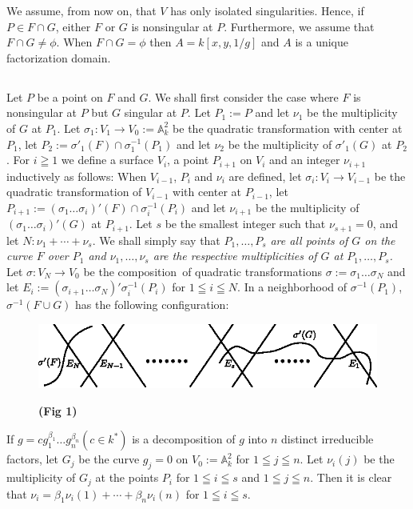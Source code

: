We assume, from now on, that $V$ has only isolated
singularities. Hence, if $P\in F\cap G$, either $F$ or $G$ is
nonsingular at $P$. Furthermore, we assume that $F\cap G\neq
\phi$. When $F\cap G=\phi$ then $A=k[x,y,1/g]$ and $A$ is a unique
factorization domain. 

\subsection{}\label{chap2:5.4}
Let $P$ be a point on $F$ and $G$. We shall first consider the case
where $F$ is nonsingular at $P$ but $G$ singular at $P$. Let
$P_{1}:=P$ and let $\nu_{1}$ be the multiplicity of $G$ at
$P_{1}$. Let $\sigma_{1}:V_{1}\to V_{0}:=\mathbb{A}^{2}_{k}$ be the
quadratic transformation with center at $P_{1}$, let
$P_{2}:=\sigma'_{1}(F)\cap \sigma^{-1}_{1}(P_{1})$ and let $\nu_{2}$
be the multiplicity of $\sigma'_{1}(G)$ at $P_{2}$. For $i\geqq 1$ we
define a surface $V_{i}$, a point $P_{i+1}$ on $V_{i}$ and an integer
$\nu_{i+1}$ inductively as follows: When $V_{i-1}$, $P_{i}$ and
$\nu_{i}$ are defined, let $\sigma_{i}:V_{i}\to V_{i-1}$ be the
quadratic transformation of $V_{i-1}$ with center at $P_{i-1}$, let
$P_{i+1}:=(\sigma_{1}\ldots\sigma_{i})'(F)\cap \sigma^{-1}_{i}(P_{i})$
and let $\nu_{i+1}$ be the multiplicity of
$(\sigma_{1}\ldots\sigma_{i})'(G)$ at $P_{i+1}$. Let $s$ be the
smallest integer such that $\nu_{s+1}=0$, and let
$N:\nu_{1}+\cdots+\nu_{s}$. We shall simply say that
$P_{1},\ldots,P_{s}$ {\em are all points of $G$ on the curve $F$ over
  $P_{1}$ and $\nu_{1},\ldots,\nu_{s}$ are the respective
  multiplicities of $G$ at $P_{1},\ldots,P_{s}$.} Let $\sigma:V_{N}\to
V_{0}$ be the composition\pageoriginale\ of quadratic transformations
$\sigma:=\sigma_{1}\ldots\sigma_{N}$ and let
$E_{i}:=(\sigma_{i+1}\ldots\sigma_{N})'\sigma^{-1}_{i}(P_{i})$ for
$1\leqq i\leqq N$. In a neighborhood of $\sigma^{-1}(P_{1})$,
$\sigma^{-1}(F\cup G)$ has the following configuration:
\begin{figure}[H]
\centering
\includegraphics[scale=1.2]{figures/chap2-fig10.eps}

\medskip
{\bf (Fig 1)}
\end{figure}

\noindent
If $g=cg^{\beta_{1}}_{1}\ldots g_{n}^{\beta_{n}}(c\in k^{\ast})$ is a
decomposition of $g$ into $n$ distinct irreducible factors, let
$G_{j}$ be the curve $g_{j}=0$ on $V_{0}:=\mathbb{A}^{2}_{k}$ for
$1\leqq j\leqq n$. Let $\nu_{i}(j)$ be the multiplicity of $G_{j}$ at
the points $P_{i}$ for $1\leqq i\leqq s$ and $1\leqq j\leqq n$. Then
it is clear that
$\nu_{i}=\beta_{1}\nu_{i}(1)+\cdots+\beta_{n}\nu_{i}(n)$ for $1\leqq
i\leqq s$.

